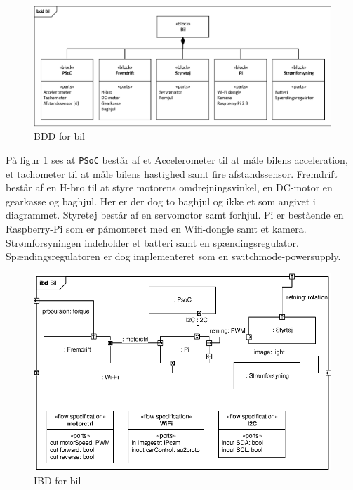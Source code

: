 \begin{figure}[H]
\centering
\includegraphics[width=\textwidth]{../fig/diagrammer/bil/bdd_bil.pdf}
\caption{BDD for bil}
\label{fig:bdd_bil}
\end{figure}

På figur \ref{fig:bdd_bil} ses at \texttt{PSoC} består af et Accelerometer til at måle bilens acceleration, et tachometer til at måle bilens hastighed samt fire afstandssensor. Fremdrift består af en H-bro til at styre motorens omdrejningsvinkel, en DC-motor en gearkasse og baghjul. Her er der dog to baghjul og ikke et som angivet i diagrammet. Styretøj består af en servomotor samt forhjul. Pi er bestående en  Raspberry-Pi som er påmonteret med en Wifi-dongle samt et kamera. Strømforsyningen indeholder et batteri samt en spændingsregulator. Spændingsregulatoren er dog implementeret som en switchmode-powersupply.  

\begin{figure}[H]
\centering
\includegraphics[scale=1]{../fig/diagrammer/bil/ibd_bil.pdf}
\caption{IBD for bil}
\label{fig:ibd_bil}
\end{figure} 

